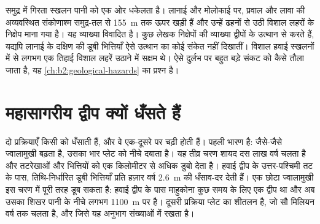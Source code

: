 \begin{omfigure}
\par{}
\end{omfigure}

समुद्र में गिरता स्खलन पानी को एक ओर धकेलता है। लानाई और मोलोकाई पर, प्रवाल और लावा की अव्यवस्थित संकोणाश्म
समुद्र-तल से \qty{155}{m} तक ऊपर खड़ी हैं और उन्हें ढहनों से उठी
विशाल लहरों के निक्षेप माना गया है। यह व्याख्या विवादित है। कुछ लेखक निक्षेपों की व्याख्या द्वीपों के
उत्थान से करते हैं, यद्यपि लानाई के दक्षिण की डूबी भित्तियाँ ऐसे उत्थान का कोई संकेत नहीं दिखातीं।
विशाल हवाई स्खलनों में से लगभग एक तिहाई विशाल लहरें उठाने में सक्षम  थे। ऐसे
दुर्लभ पर बहुत बड़े संकट को कैसे तौला जाता है, यह \cref{ch:b2:geological-hazards} का प्रश्न है।

\section{महासागरीय द्वीप क्यों धँसते हैं}\label{sec:b2:oceanic-islands:subsidence}

दो प्रक्रियाएँ किसी  को धँसाती हैं, और वे एक-दूसरे पर चढ़ी होती हैं। पहली भारण है: जैसे-जैसे ज्वालामुखी
बढ़ता है, उसका भार प्लेट को नीचे दबाता है। यह तीव्र चरण शायद दस लाख वर्ष चलता है और
तटरेखाओं और भित्तियों को एक किलोमीटर से अधिक डुबो देता है। हवाई द्वीप के उत्तर-पश्चिमी तट के पास,
तिथि-निर्धारित डूबी भित्तियाँ प्रति हज़ार वर्ष \qty{2.6}{m} की धँसाव-दर देती हैं। एक छोटा
ज्वालामुखी इस चरण में पूरी तरह डूब सकता है: हवाई द्वीप के पास माहुकोना कुछ समय के लिए एक
द्वीप था और अब उसका शिखर पानी के नीचे लगभग \qty{1100}{m} पर है। दूसरी प्रक्रिया प्लेट का
शीतलन है, जो सौ मिलियन वर्ष तक चलता है, और जिसे यह अनुभाग
संख्याओं में रखता है।

